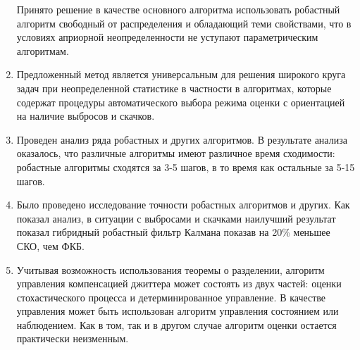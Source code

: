 \begin{enumerate}
 Принято решение в качестве основного алгоритма использовать робастный алгоритм свободный от распределения и обладающий теми свойствами, что в условиях априорной неопределенности не уступают параметрическим алгоритмам.
 
 \item Предложенный метод является универсальным для решения широкого круга задач при неопределенной статистике в частности в алгоритмах, которые содержат процедуры автоматического выбора режима оценки с ориентацией на наличие выбросов и скачков.
 
 \item Проведен анализ ряда робастных и других алгоритмов. 
 В результате анализа оказалось, что различные алгоритмы имеют различное время сходимости: робастные алгоритмы сходятся за 3-5 шагов, в то время как остальные за 5-15 шагов.
 
 \item Было проведено исследование точности робастных алгоритмов и других.
 Как показал анализ, в ситуации с выбросами и скачками наилучший результат показал гибридный робастный фильтр Калмана показав на 20\% меньшее СКО, чем ФКБ.

 \item Учитывая возможность использования теоремы о разделении, алгоритм управления компенсацией джиттера может состоять из двух частей: оценки стохастического процесса и детерминированное управление.
 В качестве управления может быть использован алгоритм управления состоянием или наблюдением.
 Как в том, так и в другом случае алгоритм оценки остается практически неизменным.
 \end{enumerate}



